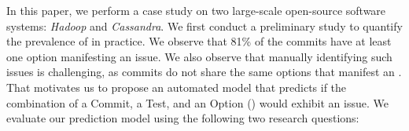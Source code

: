 

In this paper, we perform a case study on two large-scale open-source software systems: \emph{Hadoop} and \emph{Cassandra}. We first conduct a preliminary study to quantify the prevalence of \inconsistent in practice. We observe that 81\% of the commits have at least one option manifesting an \inconsistent issue. We also observe that manually identifying such issues is challenging, as commits do not share the same options that manifest an \inconsistent. That motivates us to propose an automated model that predicts if the combination of a Commit, a Test, and an Option (\textbf{\instance}) would exhibit an \inconsistent issue. We evaluate our prediction model using the following two research questions: 


